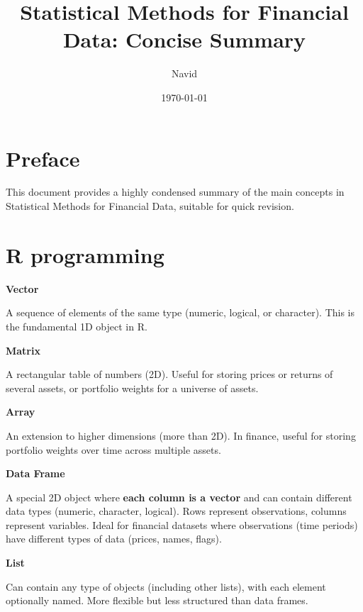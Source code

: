 \documentclass[12pt,a4paper]{article}
\title{Statistical Methods for Financial Data: Concise Summary}
\author{Navid}
\date{\today}
\begin{document}
\setlength{\parindent}{0pt}

\maketitle
\tableofcontents

\section*{Preface}
This document provides a highly condensed summary of the main concepts in Statistical Methods for Financial Data, suitable for quick revision.

\section{R programming}


\textbf{Vector}

A sequence of elements of the same type (numeric, logical, or character). This is the fundamental 1D object in R.

\vspace{0.5em}

\textbf{Matrix}

A rectangular table of numbers (2D). Useful for storing prices or returns of several assets, or portfolio weights for a universe of assets.

\vspace{0.5em}

\textbf{Array}

An extension to higher dimensions (more than 2D). In finance, useful for storing portfolio weights over time across multiple assets.

\vspace{0.5em}

\textbf{Data Frame}

A special 2D object where \textbf{each column is a vector} and can contain different data types (numeric, character, logical). Rows represent observations, columns represent variables. Ideal for financial datasets where observations (time periods) have different types of data (prices, names, flags).

\vspace{0.5em}

\textbf{List}

Can contain any type of objects (including other lists), with each element optionally named. More flexible but less structured than data frames.
\end{document}
